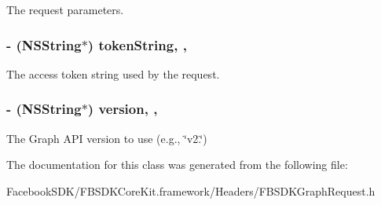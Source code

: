 The request parameters. \hypertarget{interface_f_b_s_d_k_graph_request_a96c19ad8e7bb79261467b812a70ef2c9}{
\subsubsection[{token\-String}]{\setlength{\rightskip}{0pt plus 5cm}-\/ (N\-S\-String$\ast$) token\-String\hspace{0.3cm}{\ttfamily [read]}, {\ttfamily [nonatomic]}, {\ttfamily [copy]}}}\label{interface_f_b_s_d_k_graph_request_a96c19ad8e7bb79261467b812a70ef2c9}
The access token string used by the request. \hypertarget{interface_f_b_s_d_k_graph_request_a651d49b68ef87318eddd8d794843d165}{
\subsubsection[{version}]{\setlength{\rightskip}{0pt plus 5cm}-\/ (N\-S\-String$\ast$) version\hspace{0.3cm}{\ttfamily [read]}, {\ttfamily [nonatomic]}, {\ttfamily [copy]}}}\label{interface_f_b_s_d_k_graph_request_a651d49b68ef87318eddd8d794843d165}
The Graph A\-P\-I version to use (e.\-g., \char`\"{}v2.\char`\"{}) 

The documentation for this class was generated from the following file\-:\begin{DoxyCompactItemize}
\item 
Facebook\-S\-D\-K/\-F\-B\-S\-D\-K\-Core\-Kit.\-framework/\-Headers/F\-B\-S\-D\-K\-Graph\-Request.\-h\end{DoxyCompactItemize}

